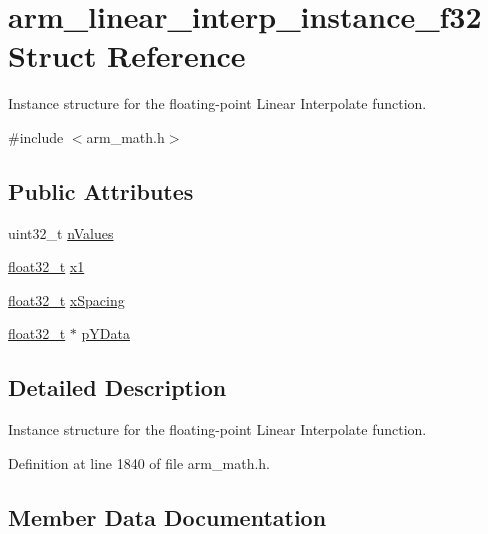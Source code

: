 \hypertarget{structarm__linear__interp__instance__f32}{}\section{arm\+\_\+linear\+\_\+interp\+\_\+instance\+\_\+f32 Struct Reference}
\label{structarm__linear__interp__instance__f32}


Instance structure for the floating-\/point Linear Interpolate function.  




{\ttfamily \#include $<$arm\+\_\+math.\+h$>$}

\subsection*{Public Attributes}
\begin{DoxyCompactItemize}
\item 
uint32\+\_\+t \hyperlink{structarm__linear__interp__instance__f32_a95f02a926b16d35359aca5b31e813b11}{n\+Values}
\item 
\hyperlink{arm__math_8h_a4611b605e45ab401f02cab15c5e38715}{float32\+\_\+t} \hyperlink{structarm__linear__interp__instance__f32_a08352dc6ea82fbc0827408e018535481}{x1}
\item 
\hyperlink{arm__math_8h_a4611b605e45ab401f02cab15c5e38715}{float32\+\_\+t} \hyperlink{structarm__linear__interp__instance__f32_aa8e2d686b5434a406d390b347b183511}{x\+Spacing}
\item 
\hyperlink{arm__math_8h_a4611b605e45ab401f02cab15c5e38715}{float32\+\_\+t} $\ast$ \hyperlink{structarm__linear__interp__instance__f32_ab373001f6afad0850359c344a4d7eee4}{p\+Y\+Data}
\end{DoxyCompactItemize}


\subsection{Detailed Description}
Instance structure for the floating-\/point Linear Interpolate function. 

Definition at line 1840 of file arm\+\_\+math.\+h.



\subsection{Member Data Documentation}
\mbox{\label{structarm__linear__interp__instance__f32_a95f02a926b16d35359aca5b31e813b11}} 

